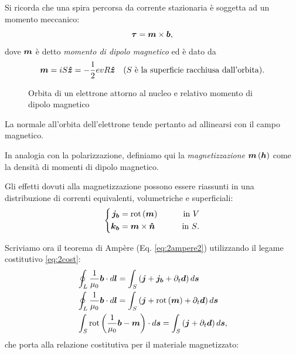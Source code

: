 Si ricorda che una spira percorsa da corrente stazionaria è soggetta ad un momento meccanico:
\begin{equation}
\boldsymbol{\tau}=\boldsymbol{m}\times\boldsymbol{b}, 
\end{equation}
\label{eq:2torque}
dove $\boldsymbol{m}$ è detto \textit{momento di dipolo magnetico} ed è dato da
\begin{equation}
\label{eq:2mom}
\boldsymbol{m}=i S \boldsymbol{\hat{z}} = -\frac{1}{2}evR\boldsymbol{\hat{z}}\quad \text{($S$ è la superficie racchiusa dall'orbita).}
\end{equation}
\begin{figure}
\caption{Orbita di un elettrone attorno al nucleo e relativo momento di dipolo magnetico}
\label{fig:2.3}
\end{figure}

La normale all'orbita dell'elettrone tende pertanto ad allinearsi con il campo magnetico.

In analogia con la polarizzazione, definiamo qui la \textit{magnetizzazione} $\boldsymbol{m}\left(\boldsymbol{h}\right)$ come la densità di momenti di dipolo magnetico.

Gli effetti dovuti alla magnetizzazione possono essere riassunti in una distribuzione di correnti equivalenti, volumetriche e superficiali:
\begin{equation}
\label{eq:2current2}
\left\{
\begin{aligned}
\boldsymbol{j_{b}} &= \text{rot} \left(\boldsymbol{m}\right) \qquad &\text{in $V$}\\
\boldsymbol{k_{b}} &= \boldsymbol{m}\times \boldsymbol{\hat{n}} \qquad &\text{in $S$}.
\end{aligned}
\right.
\end{equation}

Scriviamo ora il teorema di Ampère (Eq. \eqref{eq:2ampere2}) utilizzando il legame costitutivo \eqref{eq:2cost}:
\begin{align}
\label{eq:2current3}
&\oint_L \frac{1}{\mu_0}\boldsymbol{b} \cdot d\boldsymbol{l}  = \int_S \left( \boldsymbol{j}+\boldsymbol{j_{b}}+\partial_t\boldsymbol{d}\right) d\boldsymbol{s}\nonumber\\
&\oint_L \frac{1}{\mu_0}\boldsymbol{b} \cdot d\boldsymbol{l}  = \int_S \left( \boldsymbol{j}+\text{rot}\left(\boldsymbol{m}\right)+\partial_t\boldsymbol{d}\right) d\boldsymbol{s}\nonumber\\
&\int_S \text{rot}\left(\frac{1}{\mu_0}\boldsymbol{b}-\boldsymbol{m}\right) \cdot d\boldsymbol{s}  = \int_S \left( \boldsymbol{j}+\partial_t\boldsymbol{d}\right) d\boldsymbol{s},
\end{align}
che porta alla relazione costitutiva per il materiale magnetizzato:

